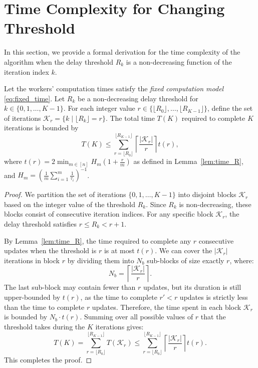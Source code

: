 \documentclass{article}
\begin{document}
\section{Time Complexity for Changing Threshold}
% 
In this section, we provide a formal derivation for the time complexity of the algorithm when the delay threshold $R_k$ is a non-decreasing function of the iteration index $k$.
% 
\begin{lemma}
    \label{lem:time_RK}
    Let the workers' computation times satisfy the \textit{fixed computation model} \eqref{eq:fixed_time}. 
    Let $R_k$ be a non-decreasing delay threshold for $k \in \{0, 1, \dots, K-1\}$.
    For each integer value $r \in \{\lfloor R_0 \rfloor, \dots, \lfloor R_{K-1} \rfloor\}$, define the set of iterations $\mathcal{K}_r = \{k \mid \lfloor R_k \rfloor = r\}$.
    The total time $T(K)$ required to complete $K$ iterations is bounded by
    \begin{equation*}
        T(K) \le \sum_{r=\lfloor R_0 \rfloor}^{\lfloor R_{K-1} \rfloor} \left\lceil \frac{|\mathcal{K}_r|}{r} \right\rceil t(r) ,
    \end{equation*}
    where $t(r) = 2 \min_{m \in [n]} H_m \left( 1 + \frac{r}{m} \right)$ as defined in Lemma~\ref{lem:time_R}, and $H_m = \left(\frac{1}{m} \sum_{i=1}^m \frac{1}{\tau_i}\right)^{-1}$.
\end{lemma}
% 
% 
\begin{proof}
    We partition the set of iterations $\{0, 1, \dots, K-1\}$ into disjoint blocks $\mathcal{K}_r$ based on the integer value of the threshold $R_k$. Since $R_k$ is non-decreasing, these blocks consist of consecutive iteration indices. For any specific block $\mathcal{K}_r$, the delay threshold satisfies $r\le R_k < r+1$. 
    
    By Lemma~\ref{lem:time_R}, the time required to complete any $r$ consecutive updates when the threshold is $r$ is at most $t(r)$.
    We can cover the $|\mathcal{K}_r|$ iterations in block $r$ by dividing them into $N_b$ sub-blocks of size exactly $r$, where:
    \begin{equation*}
        N_b = \left\lceil \frac{|\mathcal{K}_r|}{r} \right\rceil .
    \end{equation*}
    The last sub-block may contain fewer than $r$ updates, but its duration is still upper-bounded by $t(r)$, as the time to complete $r' < r$ updates is strictly less than the time to complete $r$ updates. Therefore, the time spent in each block $\mathcal{K}_r$ is bounded by $N_b \cdot t(r)$. Summing over all possible values of $r$ that the threshold takes during the $K$ iterations gives:
    \begin{equation*}
        T(K) = \sum_{r=\lfloor R_0 \rfloor}^{\lfloor R_{K-1} \rfloor} T(\mathcal{K}_r) \le \sum_{r=\lfloor R_0 \rfloor}^{\lfloor R_{K-1} \rfloor} \left\lceil \frac{|\mathcal{K}_r|}{r} \right\rceil t(r).
    \end{equation*}
    This completes the proof.
\end{proof}
\end{document}

